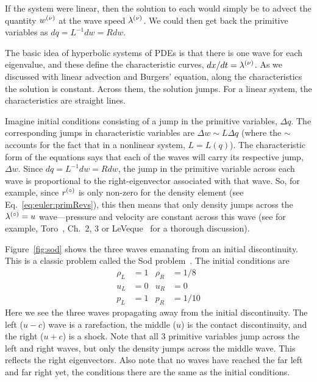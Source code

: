 If the system were linear, then the solution to each would simply be
to advect the quantity $w^{(\nu)}$ at the wave speed $\lambda^{(\nu)}$.  We
could then get back the primitive variables as $dq = L^{-1} dw = R dw$.

The basic idea of hyperbolic systems of PDEs is that there is one wave
for each eigenvalue, and these define the characteristic curves,
$dx/dt = \lambda^{(\nu)}$.  As we discussed with linear advection
and Burgers' equation, along the characteristics the solution is
constant.  Across them, the solution jumps.  For a linear system, the
characteristics are straight lines.

Imagine initial conditions consisting of a jump in the primitive
variables, $\Delta q$.  The corresponding jumps in characteristic
variables are $\Delta w \sim L \Delta q$ (where the $\sim$ accounts
for the fact that in a nonlinear system, $L = L(q)$).  The
characteristic form of the equations says that each of the waves will
carry its respective jump, $\Delta w$.  Since $dq = L^{-1}dw = R dw$,
the jump in the primitive variable across each wave is proportional to
the right-eigenvector associated with that wave.  So, for example,
since $r^{(\circ)}$ is only non-zero for the density element (see
Eq.~\ref{eq:euler:primRevs}), this then means that only density jumps
across the $\lambda^{(\circ)} = u$ wave---pressure and velocity are
constant across this wave (see for example, Toro~\cite{toro:1997},
Ch.\ 2, 3 or LeVeque~\cite{leveque:2002} for a thorough discussion).

Figure~\ref{fig:sod} shows the three waves emanating from an initial
discontinuity.  This is a classic problem called the Sod
problem~\cite{sod:1978}.  The initial conditions are
\begin{align}
\rho_L &= 1      &  \rho_R &= 1/8 \nonumber \\
u_L   &= 0       &  u_R    &= 0   \\
p_L    &= 1      &  p_R    &= 1/10 \nonumber
\end{align}
Here we see the three waves propagating away from the initial
discontinuity.  The left ($u-c$) wave is a rarefaction, the middle
($u$) is the contact discontinuity, and the right ($u+c$) is a
shock. Note that all 3 primitive variables jump across the left and
right waves, but only the density jumps across the middle wave.  This
reflects the right eigenvectors.  Also note that no waves have reached
the far left and far right yet, the conditions there are the same as
the initial conditions.  

